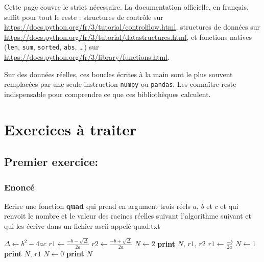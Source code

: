 \documentclass[a4paper,12pt]{article}
\begin{document}
Cette page couvre le strict nécessaire. La documentation officielle, en français, suffit pour tout le reste : structures de contrôle sur \url{https://docs.python.org/fr/3/tutorial/controlflow.html}, structures de données sur \url{https://docs.python.org/fr/3/tutorial/datastructures.html}, et fonctions natives (\texttt{len}, \texttt{sum}, \texttt{sorted}, \texttt{abs}, \dots) sur \url{https://docs.python.org/fr/3/library/functions.html}.

\begin{leftbar}
Sur des données réelles, ces boucles écrites à la main sont le plus souvent remplacées par une seule instruction \texttt{numpy} ou \texttt{pandas}. Les connaître reste indispensable pour comprendre ce que ces bibliothèques calculent.
\end{leftbar}

\clearpage
\section{Exercices \`a traiter}
\subsection{Premier exercice: }
\subsubsection{Enonc\'e}
\begin{leftbar}
Ecrire une fonction \textbf{quad} qui prend en argument trois r\'eels $a$, $b$ et $c$ et qui renvoit le nombre et le valeur des racines r\'eelles suivant l'algorithme suivant et qui les \'ecrive dans un fichier ascii appel\'e quad.txt
\end{leftbar}
\begin{algorithm}
\caption{R\'esolution de $ax^2+bx+c=0$}
\begin{algorithmic}
\State $\Delta\gets b^2-4ac$
    \State $r1\gets \displaystyle\frac{-b-\sqrt{\Delta}}{2a}$
    \State $r2\gets \displaystyle\frac{-b+\sqrt{\Delta}}{2a}$
    \State $N \gets 2$
    \newline \textbf{print} $N,\,r1,\, r2$
        \State $r1\gets  \displaystyle\frac{-b}{2a}$
        \State $N \gets 1$
        \newline \textbf{print} $N,\,r1$
\Else
        \State $N \gets 0$
        \newline \textbf{print} $N$
\EndIf
\end{algorithmic}
\end{algorithm}
\clearpage
\end{document}
